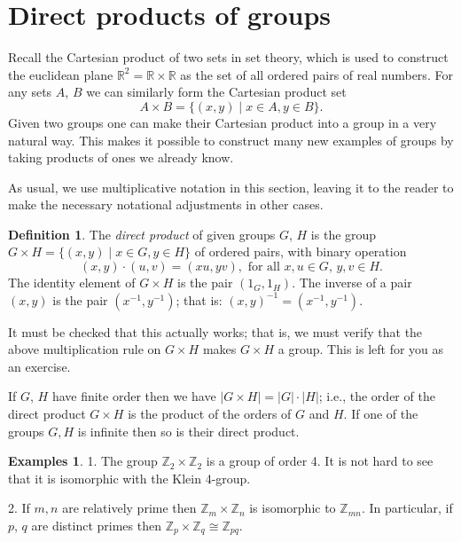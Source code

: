 \documentclass[11pt,oneside]{article}
\theoremstyle{definition}
\newtheorem{defn}[thm]{Definition}
\newtheorem{examples}[thm]{Examples}
\newcommand{\R}{\mathbb{R}} %
\newcommand{\Z}{\mathbb{Z}} %
\begin{document}
\setcounter{section}{23}

\section{Direct products of groups}\noindent
Recall the Cartesian product of two sets in set theory, which is used
to construct the euclidean plane $\R^2 = \R \times \R$ as the set of
all ordered pairs of real numbers.  For any sets $A$, $B$ we can
similarly form the Cartesian product set 
\[
  A \times B = \{ (x,y) \mid x \in A, y \in B\}.  
\]
Given two groups one can make their Cartesian product into a
group in a very natural way. This makes it possible to construct many
new examples of groups by taking products of ones we already know. 

As usual, we use multiplicative notation in this section, leaving it
to the reader to make the necessary notational adjustments in other
cases.

\begin{defn}\label{prod} 
  The \emph{direct product} of given groups $G$, $H$ is the group $G
  \times H = \{ (x,y) \mid x\in G, y\in H \}$ of ordered pairs, with
  binary operation
  \[
    (x,y) \cdot (u,v) = (xu,yv), \text{ for all $x,u\in G$, $y,v\in
    H$.}
  \]
  The identity element of $G \times H$ is the pair $(1_G, 1_{H})$.
  The inverse of a pair $(x,y)$ is the pair $(x^{-1},y^{-1})$; that
  is: $(x,y)^{-1} = (x^{-1},y^{-1})$.
\end{defn}

It must be checked that this actually works; that is, we must verify
that the above multiplication rule on $G \times H$ makes $G \times
H$ a group. This is left for you as an exercise.

If $G$, $H$ have finite order then we have $|G \times H| =
|G|\cdot|H|$; i.e., the order of the direct product $G \times H$ is
the product of the orders of $G$ and $H$. If one of the groups $G, H$
is infinite then so is their direct product.


\begin{examples} 
1. The group $\Z_2 \times \Z_2$ is a group of order 4.  It is not hard
to see that it is isomorphic with the Klein 4-group.

2. If $m,n$ are relatively prime then $\Z_m \times \Z_n$ is isomorphic
to $\Z_{mn}$.  In particular, if $p$, $q$ are distinct primes then
$\Z_p \times \Z_q \cong \Z_{pq}$.
\end{examples}
\end{document}

